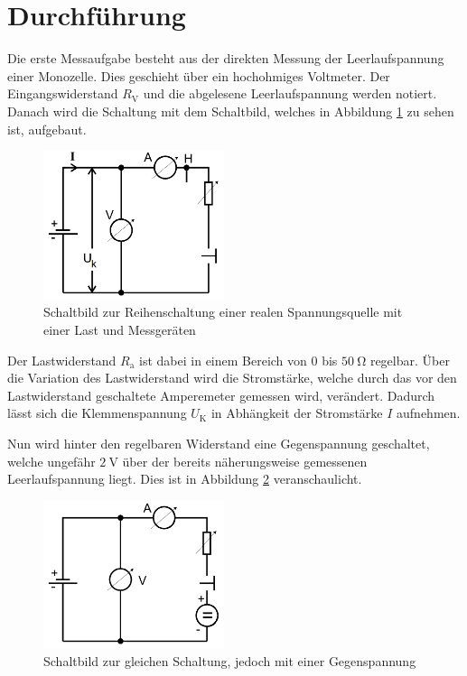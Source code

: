 \section{Durchführung}
\label{sec:Durchführung}

Die erste Messaufgabe besteht aus der direkten Messung der Leerlaufspannung einer
Monozelle. Dies geschieht über ein hochohmiges Voltmeter. Der Eingangswiderstand
$R_\text{V}$ und die abgelesene Leerlaufspannung werden notiert.
Danach wird die Schaltung mit dem Schaltbild, welches in Abbildung \ref{fig:schaltbild1}
zu sehen ist, aufgebaut.

\begin{figure}
  \centering
  \includegraphics[width=150pt]{data/schaltbild1.png}
  \caption{Schaltbild zur Reihenschaltung einer realen Spannungsquelle mit einer Last und Messgeräten \cite{Versuchsanleitung}}
  \label{fig:schaltbild1}
\end{figure}

Der Lastwiderstand $R_\text{a}$ ist dabei in einem Bereich von $0$ bis
$\SI{50}{\ohm}$ regelbar. Über die Variation des Lastwiderstand wird die Stromstärke,
welche durch das vor den Lastwiderstand geschaltete Amperemeter gemessen wird,
verändert. Dadurch lässt sich die Klemmenspannung $U_\text{K}$ in Abhängkeit der
Stromstärke $I$ aufnehmen.

Nun wird hinter den regelbaren Widerstand eine Gegenspannung geschaltet, welche
ungefähr $\SI{2}{\volt}$ über der bereits näherungsweise gemessenen Leerlaufspannung
liegt. Dies ist in Abbildung \ref{fig:schaltbild2} veranschaulicht.

\begin{figure}
  \centering
  \includegraphics[width=150pt]{data/schaltbild2.png}
  \caption{Schaltbild zur gleichen Schaltung, jedoch mit einer Gegenspannung \cite{Versuchsanleitung}}
  \label{fig:schaltbild2}
\end{figure}

